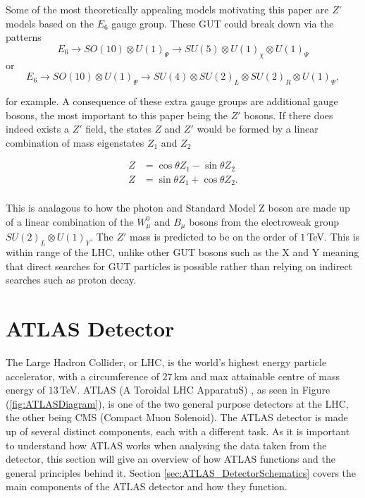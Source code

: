 \documentclass{article}
\begin{document}
Some of the most theoretically appealing models motivating this paper are $Z$' models based on the  $E_6$ gauge group. These GUT could break down via the patterns \cite{ExtraGaugeBosonsE6}
\begin{equation}
E_{6} \rightarrow SO(10) \otimes U(1)_\Psi \rightarrow SU(5)\otimes U(1)_\chi \otimes U(1)_\Psi
\end{equation}
or 
\begin{equation}
E_{6} \rightarrow SO(10) \otimes U(1)_\Psi \rightarrow SU(4) \otimes SU(2)_L \otimes SU(2)_R \otimes U(1)_\Psi,
\end{equation}

for example. A consequence of these extra gauge groups are additional gauge bosons, the most important to this paper being the $Z'$ bosons. If there does indeed exists a $Z'$ field, the states $Z$ and $Z'$ would be formed by a linear combination of mass eigenstates $Z_1$ and $Z_2$ \cite{ColliderPhysics}

\begin{equation}
\begin{split}
Z & = \cos\theta Z_1 - \sin\theta Z_2 \\
Z & = \sin\theta Z_1 + \cos\theta Z_2. \\
\end{split}
\end{equation}

This is analagous to how the photon and Standard Model Z boson are made up of a linear combination of the $W^{0}_\mu$ and $B_\mu$ bosons from the electroweak group $SU(2)_L \otimes U(1)_Y$. The $Z'$ mass is predicted to be on the order of $1\,$TeV. This is within range of the LHC, unlike other GUT bosons such as the X and Y meaning that direct searches for GUT particles is possible rather than relying on indirect searches such as proton decay.

\section{ATLAS Detector}%
\label{sec:ATLAS}

The Large Hadron Collider, or LHC, is the world's highest energy particle accelerator, with a circumference of $27\,$km and max attainable centre of mass energy of $13\,$TeV. 
ATLAS (A Toroidal LHC ApparatuS) \cite{ATLAS}, as seen in Figure (\ref{fig:ATLASDiagram}), is one of the two general purpose detectors at the LHC, the other being CMS (Compact Muon Solenoid). The ATLAS detector is made up of several distinct components, each with a different task. As it is important to understand how ATLAS works when analysing the data taken from the detector, this section will give an overview of how ATLAS functions and the general principles behind it. Section \ref{sec:ATLAS_DetectorSchematics} covers the main components of the ATLAS detector and how they function.
\end{document}
